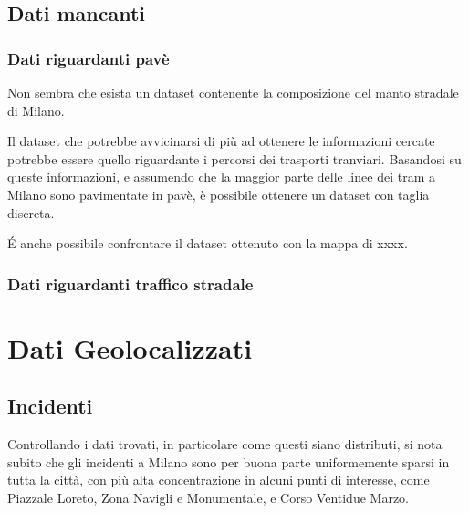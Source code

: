 \documentclass[a4paper]{report}
\begin{document}
\section{Dati mancanti}

\subsection{Dati riguardanti pavè}
Non sembra che esista un dataset contenente la composizione del manto stradale di Milano.


Il dataset che potrebbe avvicinarsi di più ad ottenere le informazioni cercate potrebbe essere 
quello riguardante i percorsi dei trasporti tranviari. Basandosi su queste informazioni, e assumendo che 
la maggior parte delle linee dei tram a Milano sono pavimentate in pavè, è possibile ottenere un dataset con taglia  discreta.

\'E anche possibile confrontare il dataset ottenuto con la mappa di xxxx.

\subsection{Dati riguardanti traffico stradale}


\chapter{Dati Geolocalizzati}

\section{Incidenti}

Controllando i dati trovati, in particolare come questi siano distributi, 
si nota subito che gli incidenti a Milano sono per buona parte uniformemente sparsi in tutta la città, 
con più alta concentrazione in alcuni punti di interesse, come Piazzale Loreto, Zona Navigli 
e Monumentale, e Corso Ventidue Marzo.
\end{document}
